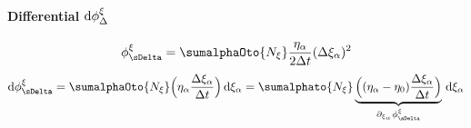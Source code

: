 \paragraph{Differential ${\rm d}\phi^{\xi}_\Delta$} \label{app:dphixi} %
\begin{align}
  \phixiDelta = \sumalphaOto{\Nxi} \frac{\etaa}{2\Delta t} (\Delta\xia)^2 
\end{align}
\begin{align}
  \rmd\phixiDelta = \sumalphaOto{\Nxi} \Big(\etaa \frac{\Delta\xia}{\Delta t}\Big)\, \rmd\xia = \sumalphato{\Nxi} \underbrace{\Big((\etaa-\eta_0 ) \frac{\Delta \xia}{\Delta t}\Big)}_{\dxia\phixiDelta} \, \rmd \xia
\end{align}

